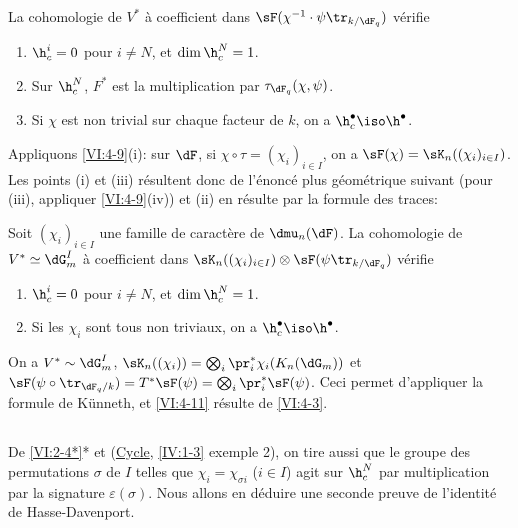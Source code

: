 \begin{proposition_}\label{VI:4-10}
La cohomologie de $V^\ast$ à coefficient dans 
$\sF(\chi^{-1}\cdot \psi\tr_{k/\dF_q})$ vérifie 
\begin{enumerate}[\indent (i)]
  \item $\h_c^i = 0$ pour $i\ne N$, et $\dim \h_c^N=1$. 
  \item Sur $\h_c^N$, $F^\ast$ est la multiplication par 
    $\tau_{\dF_q}(\chi,\psi)$. 
  \item Si $\chi$ est non trivial sur chaque facteur de $k$, on a 
    $\h_c^\bullet \iso \h^\bullet$. 
\end{enumerate}
\end{proposition_}

Appliquons \ref{VI:4-9}(i): sur $\dF$, si $\chi\circ \tau=(\chi_i)_{i\in I}$, 
on a $\sF(\chi) = \sK_n((\chi_i)_{i\in I})$. Les points (i) et (iii) 
résultent donc de l'énoncé plus géométrique suivant (pour (iii), 
appliquer \ref{VI:4-9}(iv)) et (ii) en résulte par la formule des traces: 





\begin{proposition_}\label{VI:4-11}
Soit $(\chi_i)_{i\in I}$ une famille de caractère de $\dmu_n(\dF)$. La 
cohomologie de $V^\ast\simeq \dG_m^I$ à coefficient dans 
$\sK_n((\chi_i)_{i\in I})\otimes \sF(\psi\tr_{k/\dF_q})$ vérifie 
\begin{enumerate}[\indent (i)]
  \item $\h_c^i{}=0$ pour $i\ne N$, et $\dim \h_c^N{} = 1$. 
  \item Si les $\chi_i$ sont tous non triviaux, on a 
    $\h_c^\bullet{}\iso \h^\bullet$. 
\end{enumerate}
\end{proposition_}

On a $V^\ast\sim \dG_m^I$, 
$\sK_n((\chi_i)) = \bigotimes_i \pr_i^\ast \chi_i(K_n(\dG_m))$ et 
$\sF(\psi\circ \tr_{\dF_q/k})=T^\ast \sF(\psi) = \bigotimes_i \pr_i^\ast \sF(\psi)$. 
Ceci permet d'appliquer la formule de K\"unneth, et \ref{VI:4-11} résulte de 
\ref{VI:4-3}. 





\subsection{}\label{VI:4-12}

De \ref{VI:2-4*}* et (\hyperref[IV]{Cycle}, \ref{IV:1-3} exemple 2), on tire 
aussi que le groupe des permutations $\sigma$ de $I$ telles que 
$\chi_i = \chi_{\sigma i}$ ($i\in I$) agit sur $\h_c^N$ par multiplication par 
la signature $\varepsilon(\sigma)$. Nous allons en déduire une seconde preuve 
de l'identité de Hasse-Davenport. 

